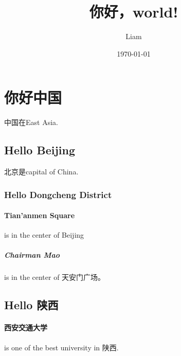 \documentclass[UTF8]{ctexart}
\title{你好，world!}
\author{Liam}
\date{\today}
\begin{document}
\maketitle
\section{你好中国}
中国在East Asia.
\subsection{Hello Beijing}
北京是capital of China.
\subsubsection{Hello Dongcheng District}
\paragraph{Tian'anmen Square}
is in the center of Beijing
\subparagraph{Chairman Mao}
is in the center of 天安门广场。
\subsection{Hello 陕西}
\paragraph{西安交通大学} is one of the best university in 陕西.
\end{document}
